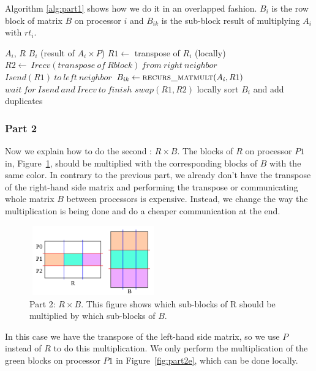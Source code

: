 Algorithm \ref{alg:part1} shows how we do it in an overlapped fashion. $B_{i}$ is the row block of matrix $B$ on processor $i$ and $B_{ik}$ is the sub-block result of multiplying $A_i$ with $rt_i$.

\begin{algorithm}[H] 
  \caption{Part 1: $B_i = A_i \times P$} \label{alg:part1} 
  \begin{algorithmic}[1]
    \Require $A_i$, $R$
    \Ensure  $B_i$ (result of $A_i \times P$)
    \State $R1 \leftarrow$ transpose of $R_i$ (locally)
      \State $R2 \leftarrow\ Irecv(transpose\ of\ R block)\ from\ right\ neighbor$
      \State $Isend(R1)\ to\ left\ neighbor$
      \State $B_{ik} \leftarrow \textsc{recurs\_matmult}(A_i, R1)$ 
      \State $wait\ for\ Isend\ and\ Irecv\ to\ finish$
      \State $swap(R1,R2)$
    \EndFor
    \State locally sort $B_i$ and add duplicates
  \end{algorithmic}
\end{algorithm}


\subsubsection{Part 2}

Now we explain how to do the second \mm: $R \times B$. The blocks of $R$ on processor $P1$ in, Figure~\ref{fig:part2d}, should be multiplied with the corresponding blocks of $B$ with the same color. In contrary to the previous part, we already don't have the transpose of the right-hand side matrix and performing the transpose or communicating whole matrix $B$ between processors is expensive. Instead, we change the way the multiplication is being done and do a cheaper communication at the end.

\begin{figure}[tbh]
 \centering
 \includegraphics[width=5.5cm,height=3cm]{./figures/part2d.pdf}
 \caption{Part 2: $R \times B$. This figure shows which sub-blocks of R should be multiplied by which sub-blocks of $B$.}
 \label{fig:part2d}
\end{figure}

In this case we have the transpose of the left-hand side matrix, so we use $P$ instead of $R$ to do this multiplication.
We only perform the multiplication of the green blocks on processor $P1$ in Figure~\ref{fig:part2e}, which can be done locally.

